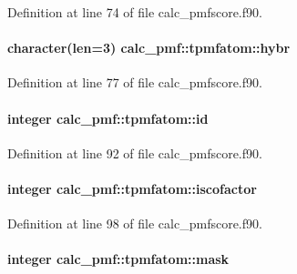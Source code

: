 Definition at line 74 of file calc\-\_\-pmfscore.\-f90.

\hypertarget{structcalc__pmf_1_1tpmfatom_aca751f5a06d770d5a01e86e37df6008e}{
\paragraph[{hybr}]{\setlength{\rightskip}{0pt plus 5cm}character(len=3) calc\-\_\-pmf\-::tpmfatom\-::hybr}}\label{structcalc__pmf_1_1tpmfatom_aca751f5a06d770d5a01e86e37df6008e}


Definition at line 77 of file calc\-\_\-pmfscore.\-f90.

\hypertarget{structcalc__pmf_1_1tpmfatom_a50bf3f3401a1c72f242e31f5a2aa8a79}{
\paragraph[{id}]{\setlength{\rightskip}{0pt plus 5cm}integer calc\-\_\-pmf\-::tpmfatom\-::id}}\label{structcalc__pmf_1_1tpmfatom_a50bf3f3401a1c72f242e31f5a2aa8a79}


Definition at line 92 of file calc\-\_\-pmfscore.\-f90.

\hypertarget{structcalc__pmf_1_1tpmfatom_a4d2d0a56e862d7d38b6692d10dfe22e3}{
\paragraph[{iscofactor}]{\setlength{\rightskip}{0pt plus 5cm}integer calc\-\_\-pmf\-::tpmfatom\-::iscofactor}}\label{structcalc__pmf_1_1tpmfatom_a4d2d0a56e862d7d38b6692d10dfe22e3}


Definition at line 98 of file calc\-\_\-pmfscore.\-f90.

\hypertarget{structcalc__pmf_1_1tpmfatom_a02749a0a7a39bf581565b018bebc594c}{
\paragraph[{mask}]{\setlength{\rightskip}{0pt plus 5cm}integer calc\-\_\-pmf\-::tpmfatom\-::mask}}\label{structcalc__pmf_1_1tpmfatom_a02749a0a7a39bf581565b018bebc594c}


